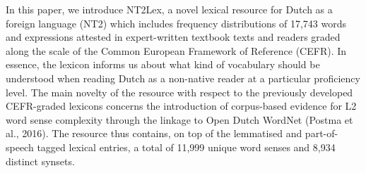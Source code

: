 In this paper, we introduce NT2Lex, a novel lexical resource for Dutch as a foreign language (NT2) which includes frequency distributions of 17,743 words and expressions attested in expert-written textbook texts and readers graded along the scale of the Common European Framework of Reference (CEFR). In essence, the lexicon informs us about what kind of vocabulary should be understood when reading Dutch as a non-native reader at a particular proficiency level. The main novelty of the resource with respect to the previously developed CEFR-graded lexicons concerns the introduction of corpus-based evidence for L2 word sense complexity through the linkage to Open Dutch WordNet (Postma et al., 2016). The resource thus contains, on top of the lemmatised and part-of-speech tagged lexical entries, a total of 11,999 unique word senses and 8,934 distinct synsets.

